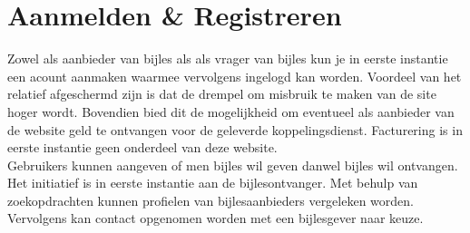 \documentclass{report}
\begin{document}
        \section{Aanmelden \& Registreren}
            Zowel als aanbieder van bijles als als vrager van bijles kun je in eerste instantie een acount aanmaken waarmee vervolgens ingelogd kan worden. Voordeel van het relatief afgeschermd zijn is dat de drempel om misbruik te maken van de site hoger wordt. Bovendien bied dit de mogelijkheid om eventueel als aanbieder van de website geld te ontvangen voor de geleverde koppelingsdienst. Facturering is in eerste instantie geen onderdeel van deze website.\\
            Gebruikers kunnen aangeven of men bijles wil geven danwel bijles wil ontvangen. Het initiatief is in eerste instantie aan de bijlesontvanger. Met behulp van zoekopdrachten kunnen profielen van bijlesaanbieders vergeleken worden. Vervolgens kan contact opgenomen worden met een bijlesgever naar keuze. 
        
\end{document}
